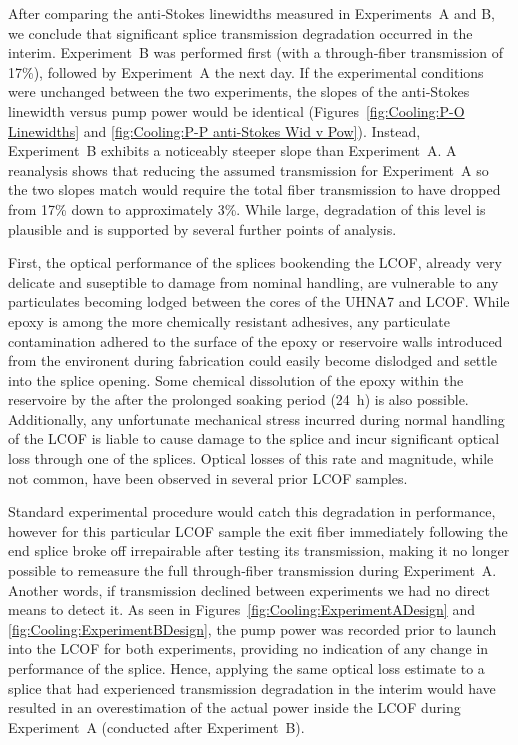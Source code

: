 After comparing the anti‐Stokes linewidths measured in Experiments~A and B, we conclude that significant splice transmission degradation occurred in the interim. Experiment~B was performed first (with a through‐fiber transmission of 17\%), followed by Experiment~A the next day. If the experimental conditions were unchanged between the two experiments, the slopes of the anti‐Stokes linewidth versus pump power would be identical (Figures~\ref{fig:Cooling:P-O Linewidths} and \ref{fig:Cooling:P-P anti-Stokes Wid v Pow}). Instead, Experiment~B exhibits a noticeably steeper slope than Experiment~A. A reanalysis shows that reducing the assumed transmission for Experiment~A so the two slopes match would require the total fiber transmission to have dropped from 17\% down to approximately 3\%. While large, degradation of this level is plausible and is supported by several further points of analysis.

First, the optical performance of the splices bookending the \ac{LCOF}, already very delicate and suseptible to damage from nominal handling, are vulnerable to any particulates becoming lodged between the cores of the \ac{UHNA7} and \ac{LCOF}. While epoxy is among the more chemically resistant adhesives, any particulate contamination adhered to the surface of the epoxy or reservoire walls introduced from the environent during fabrication could easily become dislodged and settle into the splice opening. Some chemical dissolution of the epoxy within the reservoire by the  after the prolonged soaking period (\SI{24}{\hour}) is also possible. Additionally, any unfortunate mechanical stress incurred during normal handling of the \ac{LCOF} is liable to cause damage to the splice and incur significant optical loss through one of the splices. Optical losses of this rate and magnitude, while not common, have been observed in several prior \ac{LCOF} samples.

Standard experimental procedure would catch this degradation in performance, however for this particular \ac{LCOF} sample the exit fiber immediately following the end splice broke off irrepairable after testing its transmission, making it no longer possible to remeasure the full through‐fiber transmission during Experiment~A. Another words, if transmission declined between experiments we had no direct means to detect it. As seen in Figures~\ref{fig:Cooling:ExperimentADesign} and \ref{fig:Cooling:ExperimentBDesign}, the pump power was recorded prior to launch into the \ac{LCOF} for both experiments, providing no indication of any change in performance of the splice. Hence, applying the same optical loss estimate to a splice that had experienced transmission degradation in the interim would have resulted in an overestimation of the actual power inside the \ac{LCOF} during Experiment~A (conducted after Experiment~B).

